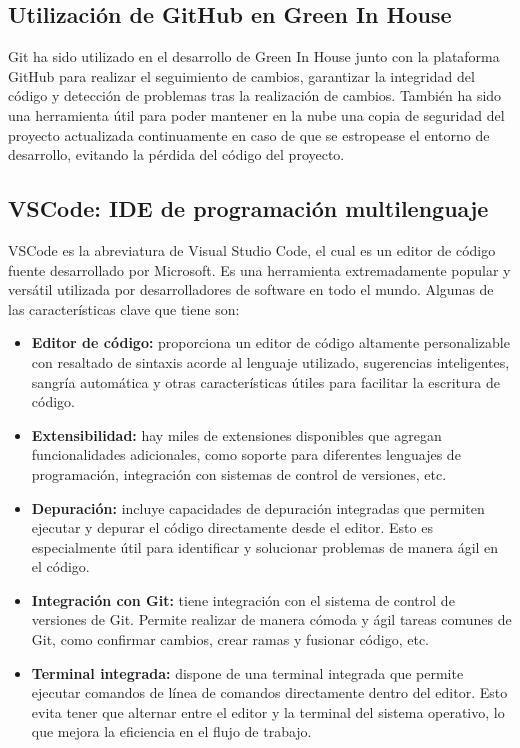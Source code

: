     \subsection{Utilización de GitHub en Green In House}
        Git ha sido utilizado en el desarrollo de Green In House junto con la plataforma GitHub para realizar el seguimiento de cambios, garantizar la integridad del código y detección de problemas tras la realización de cambios. También ha sido una herramienta útil para poder mantener en la nube una copia de seguridad del proyecto actualizada continuamente en caso de que se estropease el entorno de desarrollo, evitando la pérdida del código del proyecto.

    \subsection{VSCode: IDE de programación multilenguaje}
    VSCode \cite{wiki:vscode} es la abreviatura de Visual Studio Code, el cual es un editor de código fuente desarrollado por Microsoft. Es una herramienta extremadamente popular y versátil utilizada por desarrolladores de software en todo el mundo. Algunas de las características clave que tiene son:   
    \begin{itemize}
        \item \textbf{Editor de código:} proporciona un editor de código altamente personalizable con resaltado de sintaxis acorde al lenguaje utilizado, sugerencias inteligentes, sangría automática y otras características útiles para facilitar la escritura de código.        
        \item \textbf{Extensibilidad:} hay miles de extensiones disponibles que agregan funcionalidades adicionales, como soporte para diferentes lenguajes de programación, integración con sistemas de control de versiones, etc.        
        \item \textbf{Depuración:} incluye capacidades de depuración integradas que permiten ejecutar y depurar el código directamente desde el editor. Esto es especialmente útil para identificar y solucionar problemas de manera ágil en el código.        
        \item \textbf{Integración con Git:} tiene integración con el sistema de control de versiones de Git. Permite realizar de manera cómoda y ágil tareas comunes de Git, como confirmar cambios, crear ramas y fusionar código, etc.
        \item \textbf{Terminal integrada:} dispone de una terminal integrada que permite ejecutar comandos de línea de comandos directamente dentro del editor. Esto evita tener que alternar entre el editor y la terminal del sistema operativo, lo que mejora la eficiencia en el flujo de trabajo.
    \end{itemize}
    

